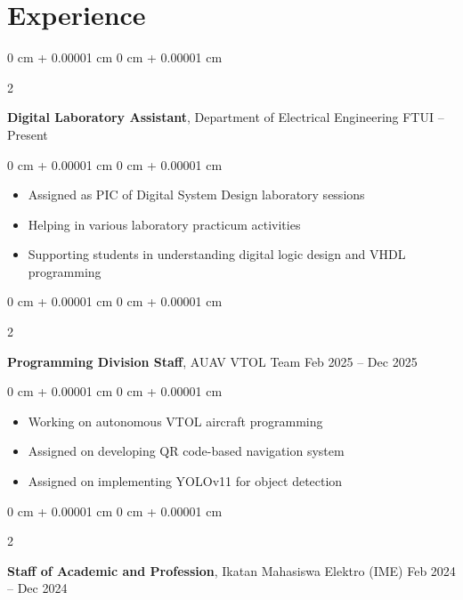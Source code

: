 \documentclass[10pt, letterpaper]{article}
\newenvironment{highlights}{
    \begin{itemize}[
        topsep=0.10 cm,
        parsep=0.10 cm,
        partopsep=0pt,
        itemsep=0pt,
        leftmargin=0 cm + 10pt
    ]
}{
    \end{itemize}
} %
\newenvironment{onecolentry}{
    \begin{adjustwidth}{
        0 cm + 0.00001 cm
    }{
        0 cm + 0.00001 cm
    }
}{
    \end{adjustwidth}
} %
\newenvironment{twocolentry}[2][]{
    \onecolentry
    \def\secondColumn{#2}
    \setcolumnwidth{\fill, 4.5 cm}
    \begin{paracol}{2}
}{
    \switchcolumn \raggedleft \secondColumn
    \end{paracol}
    \endonecolentry
} %
\begin{document}
    
    \section{Experience}



        
        \begin{twocolentry}{
            2025 – Present
        }
            \textbf{Digital Laboratory Assistant}, Department of Electrical Engineering FTUI\end{twocolentry}

        \vspace{0.10 cm}
        \begin{onecolentry}
            \begin{highlights}
                \item Assigned as PIC of Digital System Design laboratory sessions
                \item Helping in various laboratory practicum activities
                \item Supporting students in understanding digital logic design and VHDL programming
            \end{highlights}
        \end{onecolentry}


        \vspace{0.2 cm}

        \begin{twocolentry}{
            Feb 2025 – Dec 2025
        }
            \textbf{Programming Division Staff}, AUAV VTOL Team\end{twocolentry}

        \vspace{0.10 cm}
        \begin{onecolentry}
            \begin{highlights}
                \item Working on autonomous VTOL aircraft programming
                \item Assigned on developing QR code-based navigation system
                \item Assigned on implementing YOLOv11 for object detection
            \end{highlights}
        \end{onecolentry}


        \vspace{0.2 cm}

        \begin{twocolentry}{
            Feb 2024 – Dec 2024
        }
            \textbf{Staff of Academic and Profession}, Ikatan Mahasiswa Elektro (IME)\end{twocolentry}
\end{document}
